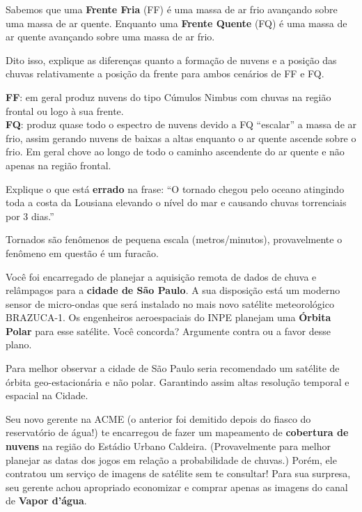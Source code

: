 \documentclass[letterpaper,portuguese,12pt,pdftex]{exam}
\begin{document}
\begin{questions}

  \question[5]
    Sabemos que uma {\bf Frente Fria} (FF) é uma massa de ar frio avançando
    sobre uma massa de ar quente.  Enquanto uma {\bf Frente Quente} (FQ) é uma
    massa de ar quente avançando sobre uma massa de ar frio.

    Dito isso, explique as diferenças quanto a formação de nuvens e a posição
    das chuvas relativamente a posição da frente para ambos cenários de FF e FQ.

    \begin{solution}
      {\bf FF}: em geral produz nuvens do tipo Cúmulos Nimbus com chuvas na
      região frontal ou logo à sua frente.\\

      {\bf FQ}: produz quase todo o espectro de nuvens devido a FQ ``escalar'' a
      massa de ar frio, assim gerando nuvens de baixas a altas enquanto o ar
      quente ascende sobre o frio.  Em geral chove ao longo de todo o caminho
      ascendente do ar quente e não apenas na região frontal.
    \end{solution}

  \question[2\half]
    Explique o que está {\bf errado} na frase: ``O tornado chegou pelo oceano
    atingindo toda a costa da Lousiana elevando o nível do mar e causando
    chuvas torrenciais por 3 dias.''

    \begin{solution}
      Tornados são fenômenos de pequena escala (metros/minutos), provavelmente
      o fenômeno em questão é um furacão.
    \end{solution}


  \question[2\half]
    Você foi encarregado de planejar a aquisição remota de dados de chuva e
    relâmpagos para a {\bf cidade de São Paulo}.  A sua disposição está um
    moderno sensor de micro-ondas que será instalado no mais novo satélite
    meteorológico BRAZUCA-1.  Os engenheiros aeroespaciais do INPE planejam uma
    {\bf Órbita Polar} para esse satélite.  Você concorda?  Argumente contra ou
    a favor desse plano.

    \begin{solution}
      Para melhor observar a cidade de São Paulo seria recomendado um satélite
      de órbita geo-estacionária e não polar.  Garantindo assim altas resolução
      temporal e espacial na Cidade.
    \end{solution}


  \question[2\half]
    Seu novo gerente na ACME\circledR{} (o anterior foi demitido depois do
    fiasco do reservatório de água!) te encarregou de fazer um mapeamento de
    {\bf cobertura de nuvens} na região do Estádio Urbano Caldeira.
    (Provavelmente para melhor planejar as datas dos jogos em relação a
    probabilidade de chuvas.) Porém, ele contratou um serviço de imagens de
    satélite sem te consultar!  Para sua surpresa, seu gerente achou apropriado
    economizar e comprar apenas as imagens do canal de {\bf Vapor d'água}.


\end{questions}
\end{document}
